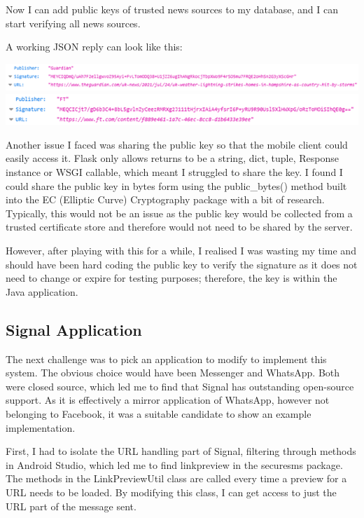 \documentclass[11pt,a4paper]{report}
\begin{document}
Now I can add public keys of trusted news sources to my database, and I can start verifying all news sources.

A working JSON reply can look like this:
\begin{center}
\includegraphics[width=1\textwidth]{image/json1.png}
\includegraphics[width=1\textwidth]{image/json2.png}
\end{center}
Another issue I faced was sharing the public key so that the mobile client could easily access it. Flask only allows returns to be a string, dict, tuple, Response instance or WSGI callable, which meant I struggled to share the key. I found I could share the public key in bytes form using the public\_bytes() method built into the EC (Elliptic Curve) Cryptography package with a bit of research. Typically, this would not be an issue as the public key would be collected from a trusted certificate store and therefore would not need to be shared by the server.

However, after playing with this for a while, I realised I was wasting my time and should have been hard coding the public key to verify the signature as it does not need to change or expire for testing purposes; therefore, the key is within the Java application.
\subsection{Signal Application}
The next challenge was to pick an application to modify to implement this system. The obvious choice would have been Messenger and WhatsApp. Both were closed source, which led me to find that Signal \citep{Signal} has outstanding open-source support. As it is effectively a mirror application of WhatsApp, however not belonging to Facebook, it was a suitable candidate to show an example implementation.

First, I had to isolate the URL handling part of Signal, filtering through methods in Android Studio, which led me to find linkpreview in the securesms package. The methods in the LinkPreviewUtil class are called every time a preview for a URL needs to be loaded. By modifying this class, I can get access to just the URL part of the message sent.
\end{document}
